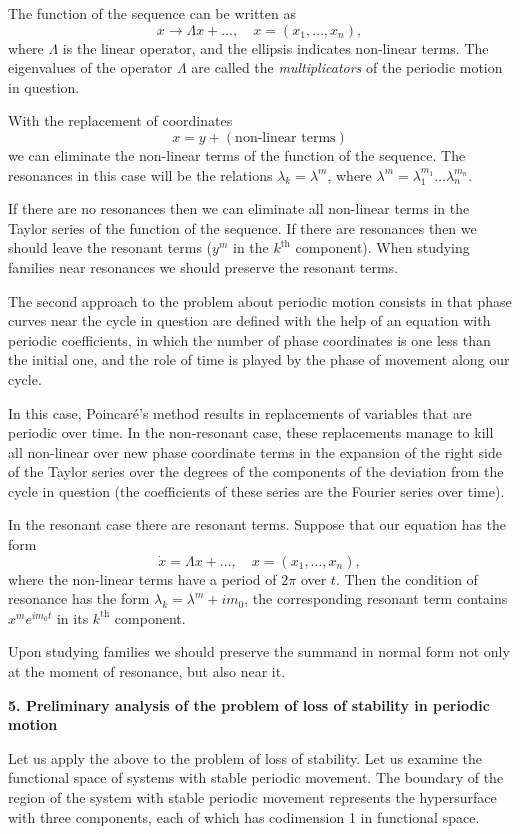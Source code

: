 \documentclass[12pt]{amsart}
\begin{document}
The function of the sequence can be written as
$$x\to\Lambda x+\dots,\quad x=(x_1,\dots,x_n),$$
where $\Lambda$ is the linear operator, and the ellipsis indicates non-linear
terms.
The eigenvalues of the operator $\Lambda$ are called the \textit{multiplicators}
of the periodic motion in question.

With the replacement of coordinates
$$x=y+(\text{non-linear terms})$$
we can eliminate the non-linear terms of the function of the sequence.
The resonances in this case will be the relations $\lambda_k=\lambda^m$, where
$\lambda^m=\lambda_1^{m_1}\dots\lambda_n^{m_n}$.

If there are no resonances then we can eliminate all non-linear terms in the
Taylor series of the function of the sequence.
If there are resonances then we should leave the resonant terms ($y^m$ in the
$k^\text{th}$ component).
When studying families near resonances we should preserve the resonant terms.

The second approach to the problem about periodic motion consists in that phase
curves near the cycle in question are defined with the help of an equation with
periodic coefficients, in which the number of phase coordinates is one less than
the initial one, and the role of time is played by the phase of movement along
our cycle.

In this case, Poincar\'e's method results in replacements of variables that are
periodic over time.
In the non-resonant case, these replacements manage to kill all non-linear over
new phase coordinate terms in the expansion of the right side of the Taylor
series over the degrees of the components of the deviation from the cycle in
question (the coefficients of these series are the Fourier series over time).

In the resonant case there are resonant terms.
Suppose that our equation has the form
$$\dot x=\Lambda x+\dots,\quad x=(x_1,\dots,x_n),$$
where the non-linear terms have a period of $2\pi$ over $t$.
Then the condition of resonance has the form $\lambda_k=\lambda^m+im_0$,
the corresponding resonant term contains $x^me^{im_0t}$ in its $k^\text{th}$
component.

Upon studying families we should preserve the summand in normal form not only at
the moment of resonance, but also near it.\\

\centerline{\textbf{5. Preliminary analysis of the problem of loss of stability
in periodic motion}}
\vspace{1em}
Let us apply the above to the problem of loss of stability.
Let us examine the functional space of systems with stable periodic movement.
The boundary of the region of the system with stable periodic movement
represents the hypersurface with three components, each of which has codimension
1 in functional space.
\end{document}

